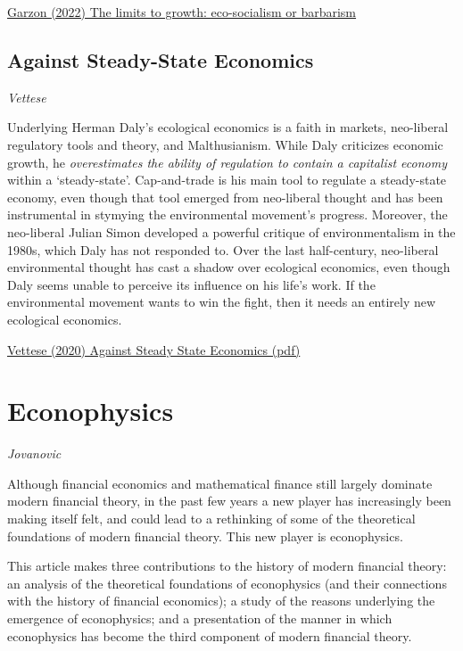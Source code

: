 \documentclass[
]{book}
\begin{document}
\href{https://la-u.org/the-limits-to-growth-eco-socialism-or-barbarism/}{Garzon (2022) The limits to growth: eco-socialism or barbarism}

\hypertarget{against-steady-state-economics}{%
\section{Against Steady-State Economics}\label{against-steady-state-economics}}

\emph{Vettese}

Underlying Herman Daly's ecological economics is a faith in markets, neo-liberal
regulatory tools and theory, and Malthusianism.
While Daly criticizes economic growth, he \emph{overestimates the ability of
regulation to contain a capitalist economy} within a `steady-state'.
Cap-and-trade is his main tool to regulate a steady-state economy, even though
that tool emerged from neo-liberal thought and has been instrumental in stymying the
environmental movement's progress. Moreover, the neo-liberal Julian Simon developed
a powerful critique of environmentalism in the 1980s, which Daly has not responded to.
Over the last half-century, neo-liberal environmental thought has cast a shadow over
ecological economics,
even though Daly seems unable to perceive its influence on his life's work.
If the environmental movement wants to win the fight, then it needs an entirely
new ecological economics.

\href{pdf/Vettese_2020_Against_Steady_State_Economics.pdf}{Vettese (2020) Against Steady State Economics (pdf)}

\hypertarget{econophysics}{%
\chapter{Econophysics}\label{econophysics}}

\emph{Jovanovic}

Although financial
economics and mathematical finance still largely dominate modern financial
theory, in the past few years a new player has increasingly been making itself
felt, and could lead to a rethinking of some of the theoretical foundations of
modern financial theory. This new player is econophysics.

This article makes three contributions to the history of
modern financial theory: an analysis of the theoretical foundations of
econophysics (and their connections with the history of financial economics); a
study of the reasons underlying the emergence of econophysics; and a
presentation of the manner in which econophysics has become the third
component of modern financial theory.
\end{document}
